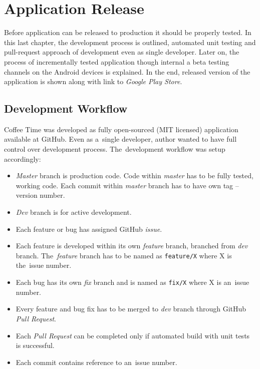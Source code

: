 \chapter{Application Release}
\label{ch:testing}

Before application can be released to production it should be properly tested. In this last chapter, the development process is outlined, automated unit testing and pull-request approach of development even as single developer. Later on, the process of incrementally tested application though internal a beta testing channels on the Android devices is explained. In the end, released version of the application is shown along with link to \textit{Google Play Store}. 

\section{Development Workflow}
Coffee Time was developed as fully open-sourced (MIT licensed) application available at GitHub. Even as a~single developer, author wanted to have full control over development process. The~development workflow was setup accordingly:

\begin{itemize}
    \item \textit{Master} branch is production code. Code within \textit{master} has to be fully tested, working code. Each commit within \textit{master} branch has to have own tag -- version number.
    \item \textit{Dev} branch is for active development. 
    \item Each feature or bug has assigned GitHub \textit{issue}.  
    \item Each feature is developed within its own \textit{feature} branch, branched from \textit{dev} branch. The~\textit{feature} branch has to be named as \verb|feature/X| where X is the~issue number.
    \item Each bug has its own \textit{fix} branch and is named as \verb|fix/X| where X is an~issue number.
    \item Every feature and bug fix has to be merged to \textit{dev} branch through GitHub \textit{Pull Request}.
    \item Each \textit{Pull Request} can be completed only if automated build with unit tests is successful.
    \item Each commit contains reference to an~issue number. 
\end{itemize}

